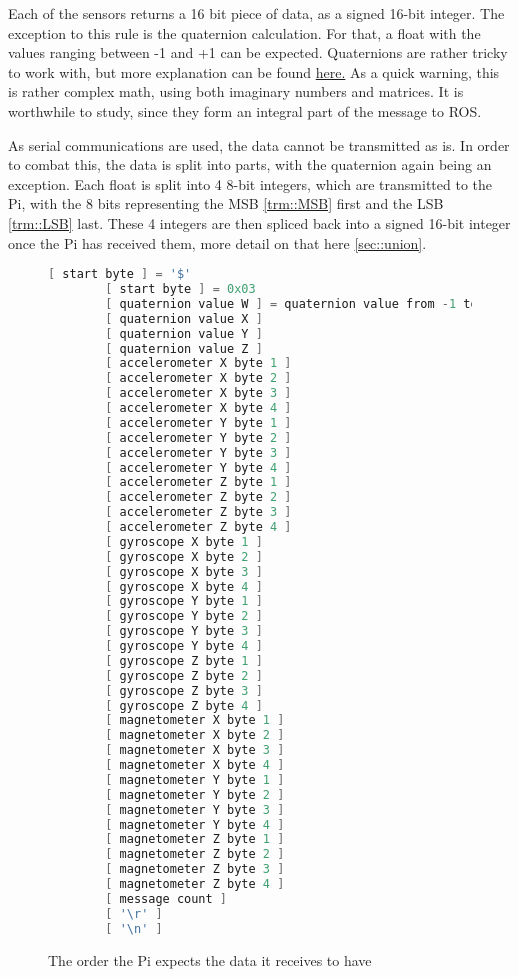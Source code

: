 Each of the sensors returns a 16 bit piece of data, as a signed 16-bit integer.
The exception to this rule is the quaternion calculation.
For that, a float with the values ranging between -1 and +1 can be expected.
Quaternions are rather tricky to work with, but more explanation can be found \href{https://www.3dgep.com/understanding-quaternions/#The_Complex_Plane}{here.}
As a quick warning, this is rather complex math, using both imaginary numbers and matrices.
It is worthwhile to study, since they form an integral part of the message to ROS.

As serial communications are used, the data cannot be transmitted as is.
In order to combat this, the data is split into parts, with the quaternion again being an exception.
Each float is split into 4 8-bit integers, which are transmitted to the Pi, with the 8 bits representing the MSB \ref{trm::MSB} first and the LSB \ref{trm::LSB} last.
These 4 integers are then spliced back into a signed 16-bit integer once the Pi has received them, more detail on that here \ref{sec::union}.


\begin{figure}[H]
    \begin{lstlisting}[language=c++,firstnumber=0]
        [ start byte ] = '$'
        [ start byte ] = 0x03
        [ quaternion value W ] = quaternion value from -1 to +1, multiplied by 100
        [ quaternion value X ]
        [ quaternion value Y ]
        [ quaternion value Z ]
        [ accelerometer X byte 1 ]
        [ accelerometer X byte 2 ]
        [ accelerometer X byte 3 ]
        [ accelerometer X byte 4 ]
        [ accelerometer Y byte 1 ]
        [ accelerometer Y byte 2 ]
        [ accelerometer Y byte 3 ]
        [ accelerometer Y byte 4 ]
        [ accelerometer Z byte 1 ]
        [ accelerometer Z byte 2 ]
        [ accelerometer Z byte 3 ]
        [ accelerometer Z byte 4 ]
        [ gyroscope X byte 1 ] 
        [ gyroscope X byte 2 ]
        [ gyroscope X byte 3 ]
        [ gyroscope X byte 4 ]       
        [ gyroscope Y byte 1 ] 
        [ gyroscope Y byte 2 ]
        [ gyroscope Y byte 3 ]
        [ gyroscope Y byte 4 ] 
        [ gyroscope Z byte 1 ] 
        [ gyroscope Z byte 2 ]
        [ gyroscope Z byte 3 ]
        [ gyroscope Z byte 4 ] 
        [ magnetometer X byte 1 ]
        [ magnetometer X byte 2 ]
        [ magnetometer X byte 3 ]
        [ magnetometer X byte 4 ]
        [ magnetometer Y byte 1 ]
        [ magnetometer Y byte 2 ]
        [ magnetometer Y byte 3 ]
        [ magnetometer Y byte 4 ]
        [ magnetometer Z byte 1 ]
        [ magnetometer Z byte 2 ]
        [ magnetometer Z byte 3 ]
        [ magnetometer Z byte 4 ]
        [ message count ]
        [ '\r' ] 
        [ '\n' ] 
    \end{lstlisting} 
\caption{The order the Pi expects the data it receives to have}
\label{fig::dataformat}
\end{figure}


